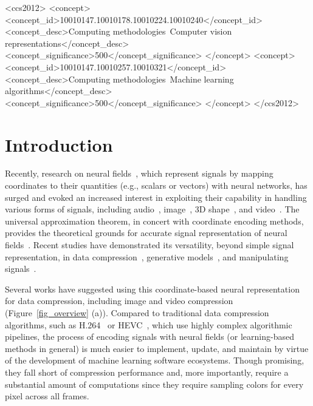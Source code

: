 \documentclass[sigconf]{acmart}
\begin{document}
\begin{CCSXML}
<ccs2012>
<concept>
<concept_id>10010147.10010178.10010224.10010240</concept_id>
<concept_desc>Computing methodologies~Computer vision representations</concept_desc>
<concept_significance>500</concept_significance>
</concept>
<concept>
<concept_id>10010147.10010257.10010321</concept_id>
<concept_desc>Computing methodologies~Machine learning algorithms</concept_desc>
<concept_significance>500</concept_significance>
</concept>
</ccs2012>
\end{CCSXML}






\maketitle

\section{Introduction}
Recently, research on neural fields~\cite{nf}, which represent signals by mapping coordinates to their quantities (e.g., scalars or vectors) with neural networks, has surged and evoked an increased interest in exploiting their capability in handling various forms of signals, including audio~\cite{SIREN}, image~\cite{liif, mod_siren, streamable}, 3D shape~\cite{loc_grid_3dscene,geo_tree,conv_occu}, and video~\cite{videoinr, video_rho}.
The universal approximation theorem, in concert with coordinate encoding methods, provides the theoretical grounds for accurate signal representation of neural fields~\cite{SIREN,nerf,instant_ngp}.
Recent studies have demonstrated its versatility, beyond simple signal representation, in data compression~\cite{img_comp, video_cohen}, generative models~\cite{gen_img, stylegan5}, and manipulating signals~\cite{editnerf}.

Several works have suggested using this coordinate-based neural representation for data compression, including image and video compression~\cite{coin,img_comp,video_cohen,video_rho} (Figure~\ref{fig_overview} (a)).
Compared to traditional data compression algorithms, such as H.264~\cite{h264} or HEVC~\cite{hevc}, which use highly complex algorithmic pipelines, the process of encoding signals with neural fields (or learning-based methods in general) is much easier to implement, update, and maintain by virtue of the development of machine learning software ecosystems.
Though promising, they fall short of compression performance and, more importantly, require a substantial amount of computations since they require sampling colors for every pixel across all frames.
\end{document}
